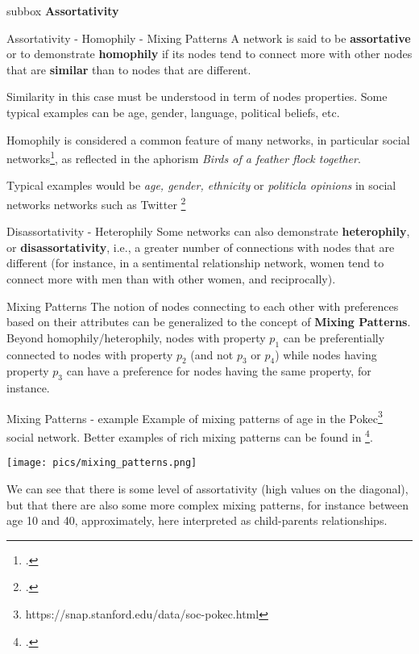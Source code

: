\begin{subbox}{subbox}{}
    \centering
    \Large{\textbf{Assortativity}}
\end{subbox}

\begin{textbox}{Assortativity - Homophily - Mixing Patterns}
    A network is said to be \textbf{assortative} or to demonstrate \textbf{homophily} if its nodes tend to connect more with other nodes that are \textbf{similar} than to nodes that are different.

    Similarity in this case must be understood in term of nodes properties. Some typical examples can be age, gender, language, political beliefs, etc.

    Homophily is considered a common feature of many networks, in particular social networks\footcite{mcpherson2001birds}, as reflected in the aphorism \textit{Birds of a feather flock together}.

    Typical examples would be \textit{age, gender, ethnicity} or \textit{politicla opinions} in social networks networks such as Twitter \footcite{mcpherson2001birds}
\end{textbox}


\begin{textbox}{Disassortativity - Heterophily}
    Some networks can also demonstrate \textbf{heterophily}, or \textbf{disassortativity}, i.e., a greater number of connections with nodes that are different (for instance, in a sentimental relationship network, women tend to connect more with men than with other women, and reciprocally).
\end{textbox}


\begin{textbox}{Mixing Patterns}
    The notion of nodes connecting to each other with preferences based on their attributes can be generalized to the concept of \textbf{Mixing Patterns}. Beyond homophily/heterophily, nodes with property $p_1$ can be preferentially connected to nodes with property $p_2$ (and not $p_3$ or $p_4$) while nodes having property $p_3$ can have a preference for nodes having the same property, for instance.
\end{textbox}


\begin{textbox}{Mixing Patterns - example}
    Example of mixing patterns of age in the Pokec\footnote{https://snap.stanford.edu/data/soc-pokec.html} social  network. Better examples of rich mixing patterns can be found in \footcite{del2007mixing}.

    \centering
    \texttt{[image: pics/mixing\_patterns.png]}

    We can see that there is some level of assortativity (high values on the diagonal), but that there are also some more complex mixing patterns, for instance between age 10 and 40, approximately, here interpreted as child-parents relationships.
\end{textbox}


